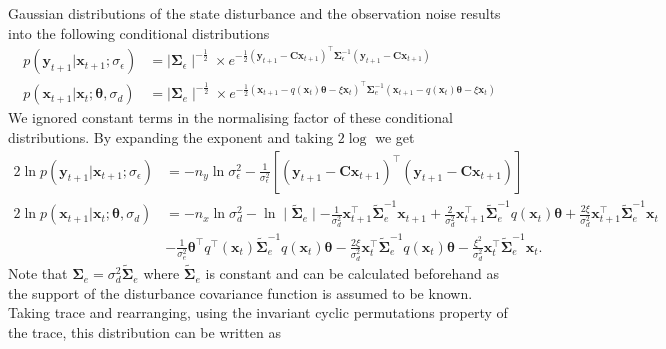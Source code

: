 \documentclass[]{article}
\begin{document}
Gaussian distributions of the state disturbance and the observation noise results into the following conditional distributions
\begin{align}
 p\left(\mathbf y_{t+1}|\mathbf x_{t+1};\sigma_{\epsilon}\right)&= \mid\boldsymbol\Sigma_{\epsilon}\mid^{-\frac{1}{2}} \times  e^{-\frac{1}{2}(\mathbf y_{t+1}-\mathbf C\mathbf  x_{t+1})^\top\boldsymbol\Sigma_{\epsilon}^{-1}(\mathbf y_{t+1}-\mathbf C\mathbf  x_{t+1}) } \\
p(\mathbf x_{t+1}|\mathbf x_{t};\boldsymbol \theta ,\sigma_d)&= \mid\boldsymbol\Sigma_{e}\mid^{-\frac{1}{2}} \times e^{-\frac{1}{2}(\mathbf x_{t+1}-q(\mathbf  x_t)\boldsymbol\theta-\xi  \mathbf x_t)^\top\boldsymbol\Sigma_e^{-1}(\mathbf x_{t+1}-q( \mathbf x_t)\boldsymbol\theta-\xi \mathbf  x_t)}
\end{align}
We ignored constant terms in the normalising factor of these conditional distributions. By expanding the exponent and taking $2\log$ we get
\begin{align}\label{eq:CondititionDist1}
2\ln p\left(\mathbf y_{t+1}|\mathbf x_{t+1};\sigma_{\epsilon}\right)&=-n_y\ln \sigma_{\epsilon}^2-\frac{1}{\sigma_{\epsilon}^2}\left[ (\mathbf y_{t+1}-\mathbf C\mathbf  x_{t+1})^\top(\mathbf y_{t+1}-\mathbf C\mathbf  x_{t+1})\right]  \\
2\ln p(\mathbf x_{t+1}|\mathbf x_{t};\boldsymbol \theta ,\sigma_d)&=-n_x\ln\sigma_d^2-\ln\mid\tilde{\boldsymbol\Sigma}_e\mid-\frac{1}{\sigma_d^2}\mathbf x_{t+1}^\top\tilde{\boldsymbol\Sigma}_e^{-1}\mathbf x_{t+1}+\frac{2}{\sigma_d^2}\mathbf x_{t+1}^\top\tilde{\boldsymbol\Sigma}_e^{-1}q( \mathbf x_t)\boldsymbol\theta+\frac{2\xi}{\sigma_d^2}\mathbf x_{t+1}^\top\tilde{\boldsymbol\Sigma}_e^{-1}\mathbf x_t \nonumber \\
&-\frac{1}{\sigma_e^2}\boldsymbol\theta^\top q^\top(\mathbf x_t)\tilde{\boldsymbol\Sigma}_e^{-1}q(\mathbf x_t)\boldsymbol\theta-\frac{2\xi}{\sigma_d^2} \mathbf x_t^\top\tilde{\boldsymbol\Sigma}_e^{-1}q(\mathbf x_t)\boldsymbol\theta-\frac{\xi^2}{\sigma_d^2}\mathbf x_t^\top\tilde{\boldsymbol\Sigma}_e^{-1}\mathbf x_t. \label{eq:CondititionDist2}
\end{align}
Note that $\boldsymbol\Sigma_e=\sigma_d^2\tilde{\boldsymbol\Sigma}_e$ where $\tilde{\boldsymbol\Sigma}_e$ is constant and can be calculated beforehand as the support of the disturbance covariance function is assumed to be known. Taking trace and rearranging, using the invariant cyclic permutations property of the trace, this distribution can be written as
\end{document}
